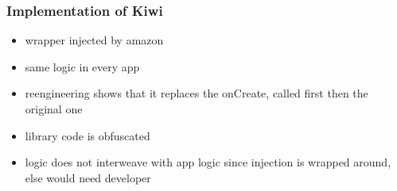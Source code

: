 \subsubsection{Implementation of Kiwi} \label{section:license-amazon-implementation}
\begin{itemize}
    \item wrapper injected by amazon
    \item same logic in every app
    \item reengineering shows that it replaces the onCreate, called first then the original one
    \item library code is obfuscated
    \item logic does not interweave with app logic since injection is wrapped around, else would need developer
\end{itemize}
